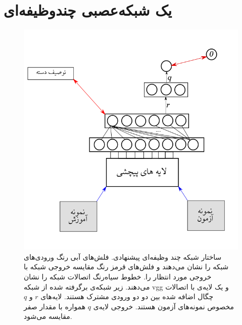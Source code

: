 \section{یک شبکه‌عصبی چندوظیفه‌ای}\label{nn}
\begin{figure}[!t]
\centering
\includegraphics[width=0.85\linewidth]{images/net}
\caption[شبکه‌ی چندوظیفه‌ای پیشنهادی]{
ساختار شبکه چند وظیفه‌ای پیشنهادی. فلش‌های آبی رنگ ورودی‌های شبکه را نشان می‌دهند و فلش‌های قرمز رنگ مقایسه خروجی شبکه با خروجی مورد انتظار را. خطوط سیاه‌رنگ اتصالات شبکه‌ را نشان می‌دهند. زیر شبکه‌ی برگرفته شده از شبکه vgg و یک لایه‌ی با اتصالات چگال اضافه شده بین دو دو ورودی مشترک هستند. لایه‌های $r$ و $q$ مخصوص نمونه‌های آزمون هستند. خروجی لایه‌ی $q$ همواره با مقدار صفر مقایسه می‌شود.
}
\label{fig:nn2}
\end{figure}

